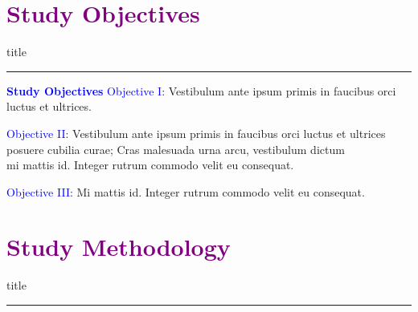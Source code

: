 \documentclass[aspectratio=169]{beamer}
\begin{document}
\section{\textbf{\textcolor{purple}{Study Objectives}}}
    \begin{frame}[plain]
        \vfill
      \centering
      \begin{beamercolorbox}[sep=8pt,center,shadow=true,rounded=true]{title}
        \insertsectionhead\par%
        \color{oxfordblue}\noindent\rule{10cm}{1pt}
      \end{beamercolorbox}
      \vfill
  \end{frame}

\begin{frame}{\textcolor{blue}{\textbf{Study Objectives}}}
    \textcolor{blue}{Objective I}: Vestibulum ante ipsum primis in faucibus orci luctus et ultrices.\\

    \vspace{2mm}
    
    \textcolor{blue}{Objective II}: Vestibulum ante ipsum primis in faucibus orci luctus et ultrices\\  \hspace{2.3cm} posuere cubilia curae; Cras malesuada urna arcu, vestibulum dictum\\  \hspace{2.3cm} mi mattis id. Integer rutrum commodo velit eu consequat. \\

    \vspace{2mm}
    
    \textcolor{blue}{Objective III}: Mi mattis id. Integer rutrum commodo velit eu consequat.
    
\end{frame}

\section{\textbf{\textcolor{purple}{Study Methodology}}}
    \begin{frame}[plain]
        \vfill
      \centering
      \begin{beamercolorbox}[sep=8pt,center,shadow=true,rounded=true]{title}
        \insertsectionhead\par%
        \color{oxfordblue}\noindent\rule{10cm}{1pt}
      \end{beamercolorbox}
      \vfill
  \end{frame}
\end{document}
